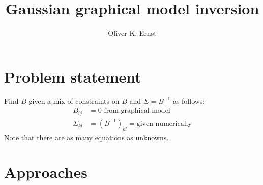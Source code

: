 \documentclass[11pt]{article}
\title{Gaussian graphical model inversion}
\author{Oliver K. Ernst}
\begin{document}
\maketitle


\section{Problem statement}


Find $B$ given a mix of constraints on $B$ and $\Sigma = B^{-1}$ as follows:
\begin{equation}
\begin{split}
B_{ij} &= 0 \text{ from graphical model} \\
\Sigma_{kl} &= (B^{-1})_{kl} = \text{given numerically}
\end{split}
\label{eq:problem}
\end{equation}
Note that there are as many equations as unknowns.


\section{Approaches}

\end{document}
